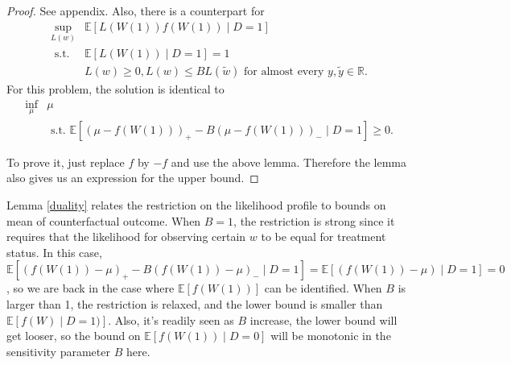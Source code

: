 \documentclass[12pt]{article}
\newcommand{\Ep}{\mathbb{E}}
\begin{document}
	\begin{proof}
		See appendix. Also, there is a counterpart for \begin{equation*}
		\begin{array}{ll}
		\sup _{L(w)} & \mathbb{E}[L(W(1))f(W(1)) \mid D=1] \\
		\text { s.t. } & \mathbb{E}[L(W(1)) \mid D=1]=1 \\
		& L(w) \geq 0, L(w) \leq B L(\tilde{w}) \text { for almost every } y, \tilde{y} \in \mathbb{R}.
		\end{array}
		\end{equation*}
		For this problem, the solution is identical to \begin{equation*}
		\begin{array}{ll}
		\inf _{\mu} & \mu \\
		& \text { s.t. }  \mathbb{E}\left[(\mu-f(W(1)))_{+}-B(\mu-f(W(1)))_{-} \mid D=1\right] \geq 0.
		\end{array}
		\end{equation*}
		
		To prove it, just replace $f$ by $-f$ and use the above lemma. Therefore the lemma also gives us an expression for the upper bound.
	\end{proof}
	
	Lemma \ref{duality} relates the restriction on the likelihood profile to bounds on mean of counterfactual outcome. When $B = 1$, the restriction is strong since it requires that the likelihood for observing certain $w$ to be equal for treatment status. In this case, $\mathbb{E}\left[(f(W(1))-\mu)_{+}-B(f(W(1))-\mu)_{-} \mid D=1\right] = \mathbb{E}\left[(f(W(1))-\mu) \mid D=1\right] = 0$, so we are back in the case where $\Ep[f(W(1))]$ can be identified. When $B$ is larger than 1, the restriction is relaxed, and the lower bound is smaller than $\Ep[f(W) \mid D = 1)]$. Also, it's readily seen as $B$ increase, the lower bound will get looser, so the bound on $\Ep[f(W(1)) \mid D = 0]$ will be monotonic in the sensitivity parameter $B$ here. 
\end{document}
